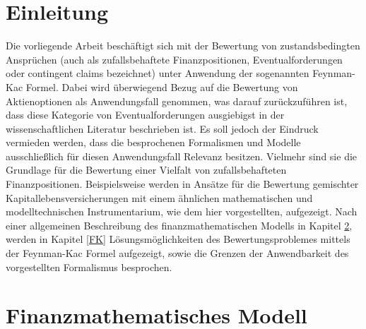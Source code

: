 \documentclass[12pt,a4paper,headsepline,bibliography=totoc,listof=totoc,headinclude=false,footinclude=false,BCOR5mm]{scrreprt} %
\begin{document}

\tableofcontents


 
\chapter{Einleitung}
Die vorliegende Arbeit besch\"aftigt sich mit der Bewertung von zustandsbedingten Anspr\"uchen (auch als  zufallsbehaftete Finanzpositionen, Eventualforderungen oder contingent claims bezeichnet) unter Anwendung der sogenannten Feynman-Kac Formel. Dabei wird \"uberwiegend Bezug auf die Bewertung von Aktienoptionen als Anwendungsfall genommen, was darauf zur\"uckzuf\"uhren ist, dass diese Kategorie von Eventualforderungen ausgiebigst in der wissenschaftlichen Literatur beschrieben ist. Es soll jedoch der Eindruck vermieden werden, dass die besprochenen Formalismen und Modelle ausschlie{\ss}lich f\"ur diesen Anwendungsfall Relevanz besitzen. Vielmehr sind sie die Grundlage f\"ur die Bewertung einer Vielfalt von zufallsbehafteten Finanzpositionen. Beispielsweise werden in \cite{Zaglauer2006} Ans\"atze f\"ur die Bewertung gemischter Kapitallebensversicherungen mit einem \"ahnlichen mathematischen und modelltechnischen Instrumentarium, wie dem hier vorgestellten, aufgezeigt. Nach einer allgemeinen Beschreibung des finanzmathematischen Modells in Kapitel \ref{fmm}, werden in Kapitel  \ref{FK} L\"osungsm\"oglichkeiten des Bewertungsproblemes mittels der Feynman-Kac Formel aufgezeigt, sowie die Grenzen der Anwendbarkeit des vorgestellten Formalismus besprochen.

\chapter{Finanzmathematisches Modell}\label{fmm}
\end{document}
